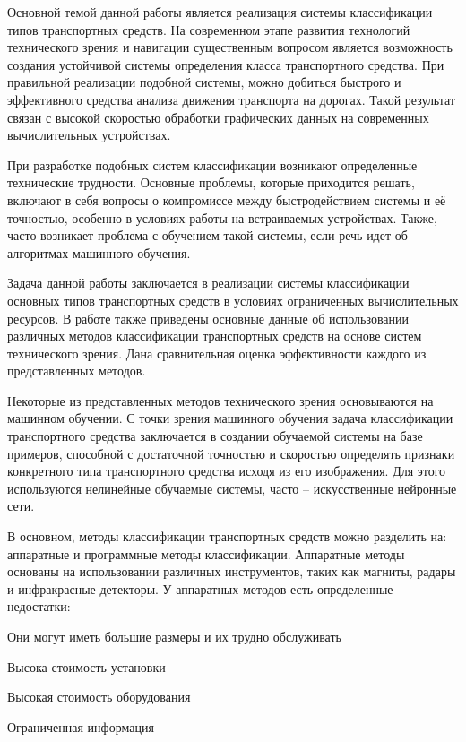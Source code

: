 \intro

Основной темой данной работы является реализация системы классификации типов транспортных средств. На современном этапе развития технологий технического зрения и навигации существенным вопросом является возможность создания устойчивой системы определения класса транспортного средства. При правильной реализации подобной системы, можно добиться быстрого и эффективного средства анализа движения транспорта на дорогах. Такой результат связан с высокой скоростью обработки графических данных на современных вычислительных устройствах. 

При разработке подобных систем классификации возникают определенные технические трудности. Основные проблемы, которые приходится решать, включают в себя вопросы о компромиссе между быстродействием системы и её точностью, особенно в условиях работы на встраиваемых устройствах. Также, часто возникает проблема с обучением такой системы, если речь идет об алгоритмах машинного обучения.

Задача данной работы заключается в реализации системы классификации основных типов транспортных средств в условиях ограниченных вычислительных ресурсов. В работе также приведены основные данные об использовании различных методов классификации транспортных средств на основе систем технического зрения. Дана сравнительная оценка эффективности каждого из представленных методов. 

Некоторые из представленных методов технического зрения основываются на машинном обучении. С точки зрения машинного обучения задача классификации транспортного средства заключается в создании обучаемой системы на базе примеров, способной с достаточной точностью и скоростью определять признаки конкретного типа транспортного средства исходя из его изображения. Для этого используются нелинейные обучаемые системы, часто – искусственные нейронные сети. 

В основном, методы классификации транспортных средств можно разделить на: аппаратные и программные методы классификации. Аппаратные методы основаны на использовании различных инструментов, таких как магниты, радары и инфракрасные детекторы. У аппаратных методов есть определенные недостатки:
%
\begin{itemize*}
  \item Они могут иметь большие размеры и их трудно обслуживать
  \item Высока стоимость установки
  \item Высокая стоимость оборудования
  \item Ограниченная информация
\end{itemize*}
%

